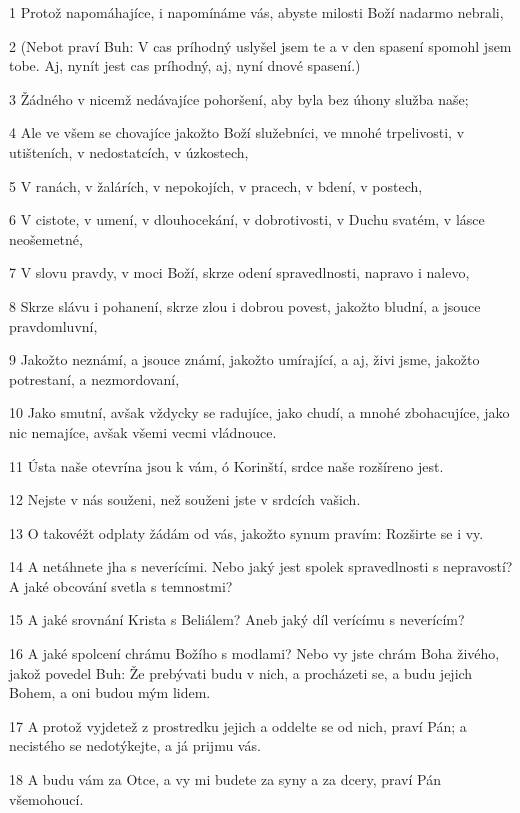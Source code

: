 \par 1 Protož napomáhajíce, i napomínáme vás, abyste milosti Boží nadarmo nebrali,
\par 2 (Nebot praví Buh: V cas príhodný uslyšel jsem te a v den spasení spomohl jsem tobe. Aj, nynít jest cas príhodný, aj, nyní dnové spasení.)
\par 3 Žádného v nicemž nedávajíce pohoršení, aby byla bez úhony služba naše;
\par 4 Ale ve všem se chovajíce jakožto Boží služebníci, ve mnohé trpelivosti, v utišteních, v nedostatcích, v úzkostech,
\par 5 V ranách, v žalárích, v nepokojích, v pracech, v bdení, v postech,
\par 6 V cistote, v umení, v dlouhocekání, v dobrotivosti, v Duchu svatém, v lásce neošemetné,
\par 7 V slovu pravdy, v moci Boží, skrze odení spravedlnosti, napravo i nalevo,
\par 8 Skrze slávu i pohanení, skrze zlou i dobrou povest, jakožto bludní, a jsouce pravdomluvní,
\par 9 Jakožto neznámí, a jsouce známí, jakožto umírající, a aj, živi jsme, jakožto potrestaní, a nezmordovaní,
\par 10 Jako smutní, avšak vždycky se radujíce, jako chudí, a mnohé zbohacujíce, jako nic nemajíce, avšak všemi vecmi vládnouce.
\par 11 Ústa naše otevrína jsou k vám, ó Korinští, srdce naše rozšíreno jest.
\par 12 Nejste v nás souženi, než souženi jste v srdcích vašich.
\par 13 O takovéžt odplaty žádám od vás, jakožto synum pravím: Rozširte se i vy.
\par 14 A netáhnete jha s neverícími. Nebo jaký jest spolek spravedlnosti s nepravostí? A jaké obcování svetla s temnostmi?
\par 15 A jaké srovnání Krista s Beliálem? Aneb jaký díl verícímu s neverícím?
\par 16 A jaké spolcení chrámu Božího s modlami? Nebo vy jste chrám Boha živého, jakož povedel Buh: Že prebývati budu v nich, a procházeti se, a budu jejich Bohem, a oni budou mým lidem.
\par 17 A protož vyjdetež z prostredku jejich a oddelte se od nich, praví Pán; a necistého se nedotýkejte, a já prijmu vás.
\par 18 A budu vám za Otce, a vy mi budete za syny a za dcery, praví Pán všemohoucí.

